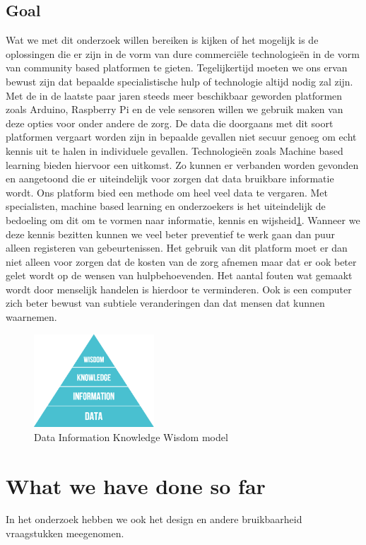 \documentclass{below-ext}
\begin{document}
\subsection{Goal}
Wat we met dit onderzoek willen bereiken is kijken of het mogelijk is de oplossingen die er zijn in de vorm van dure commerciële technologieën in de vorm van community based platformen te gieten. Tegelijkertijd moeten we ons ervan bewust zijn dat bepaalde specialistische hulp of technologie altijd nodig zal zijn. Met de in de laatste paar jaren steeds meer beschikbaar geworden platformen zoals Arduino, Raspberry Pi en de vele sensoren willen we gebruik maken van deze opties voor onder andere de zorg. De data die doorgaans met dit soort platformen vergaart worden zijn in bepaalde gevallen niet secuur genoeg om echt kennis uit te halen in individuele gevallen. Technologieën zoals Machine based learning bieden hiervoor een uitkomst. Zo kunnen er verbanden worden gevonden en aangetoond die er uiteindelijk voor zorgen dat data bruikbare informatie wordt. Ons platform bied een methode om heel veel data te vergaren. Met specialisten, machine based learning en onderzoekers is het uiteindelijk de bedoeling om dit om te vormen naar informatie, kennis en wijsheid\ref{fig1:dikw}. Wanneer we deze kennis bezitten kunnen we veel beter preventief te werk gaan dan puur alleen registeren van gebeurtenissen. Het gebruik van dit platform moet er dan niet alleen voor zorgen dat de kosten van de zorg afnemen maar dat er ook beter gelet wordt op de wensen van hulpbehoevenden. Het aantal fouten wat gemaakt wordt door menselijk handelen is hierdoor te verminderen. Ook is een computer zich beter bewust van subtiele veranderingen dan dat mensen dat kunnen waarnemen. 
\begin{figure}
\center
\label{fig1:dikw}
\includegraphics[width=0.4\textwidth]{dikw}
\caption{Data Information Knowledge Wisdom model}
\end{figure}
\section{What we have done so far}
In het onderzoek hebben we ook het design en andere bruikbaarheid vraagstukken meegenomen. 
\end{document}
